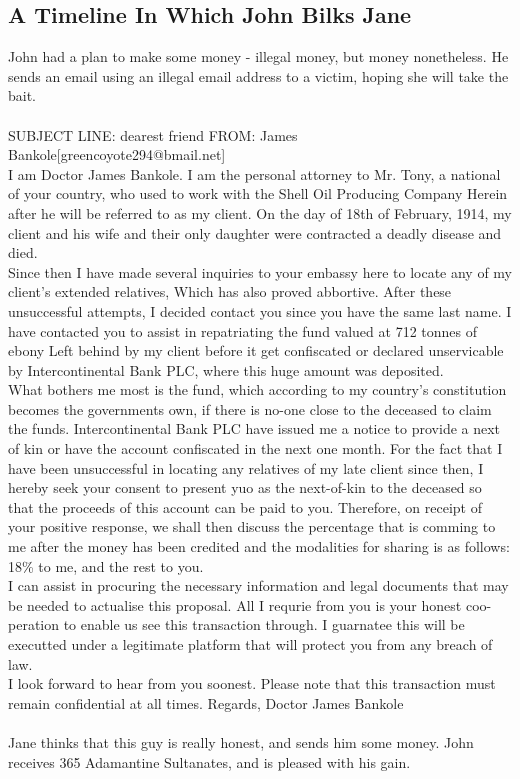 \documentclass{article}
\begin{document}
\subsection{A Timeline In Which John Bilks Jane}


John had a plan to make some money {-} illegal money, but money nonetheless.
He sends an email using an illegal email address to a victim, hoping she will take the bait.
\\\\
SUBJECT LINE: dearest friend
FROM: James Bankole[greencoyote294@bmail.net]
\\
I am Doctor James Bankole.
I am the personal attorney to Mr. Tony, a national of your country, who used to work with the Shell Oil Producing Company
Herein after he will be referred to as my client.
On the day of 18th of February, 1914, my client and his wife and their only daughter were contracted a deadly disease and died.
\\
Since then I have made several inquiries to your embassy here to locate any of my client's extended relatives, Which has also proved abbortive.
After these unsuccessful attempts, I decided contact you since you have the same last name.
I have contacted you to assist in repatriating the fund valued at 712 tonnes of ebony Left behind by my client before it get confiscated or declared unservicable by Intercontinental Bank PLC, where this huge amount was deposited.
\\
What bothers me most is the fund, which according to my country's constitution becomes the governments own, if there is no{-}one close to the deceased to claim the funds.
Intercontinental Bank PLC have issued me a notice to provide a next of kin or have the account confiscated in the next one month.
For the fact that I have been unsuccessful in locating any relatives of my late client since then, I hereby seek your consent to present yuo as the next{-}of{-}kin to the deceased so that the proceeds of this account can be paid to you.
Therefore, on receipt of your positive response, we shall then discuss the percentage that is comming to me after the money has been credited and the modalities for sharing is as follows: 18\% to me, and the rest to you.
\\
I can assist in procuring the necessary information and legal documents that may be needed to actualise this proposal.
All I requrie from you is your honest coo{-}peration to enable us see this transaction through.
I guarnatee this will be executted under a legitimate platform that will protect you from any breach of law.
\\
I look forward to hear from you soonest.
Please note that this transaction must remain confidential at all times.
Regards, Doctor James Bankole
\\\\
Jane thinks that this guy is really honest, and sends him some money.
John receives 365 Adamantine Sultanates, and is pleased with his gain.
\end{document}
